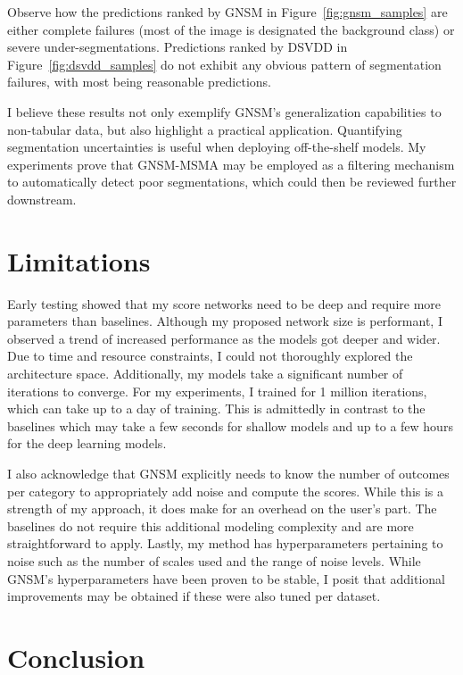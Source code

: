 Observe how the predictions ranked by GNSM in Figure~\ref{fig:gnsm_samples} are either complete failures (most of the image is designated the background class) or severe under-segmentations. Predictions ranked by DSVDD in Figure~\ref{fig:dsvdd_samples} do not exhibit any obvious pattern of segmentation failures, with most being reasonable predictions.


I believe these results not only exemplify GNSM’s generalization capabilities to non-tabular data, but also highlight a practical application. Quantifying segmentation uncertainties is useful when deploying off-the-shelf models. My experiments prove that GNSM-MSMA may be employed as a filtering mechanism to automatically detect poor segmentations, which could then be reviewed further downstream.

\section{Limitations}

Early testing showed that my score networks need to be deep and require more parameters than baselines. Although my proposed network size is performant, I observed a trend of increased performance as the models got deeper and wider. Due to time and resource constraints, I could not thoroughly explored the architecture space. Additionally, my models take a significant number of iterations to converge. For my experiments, I trained for 1 million iterations, which can take up to a day of training. This is admittedly in contrast to the baselines which may take a few seconds for shallow models and up to a few hours for the deep learning models.

I also acknowledge that GNSM explicitly needs to know the number of outcomes per category to appropriately add noise and compute the scores. While this is a strength of my approach, it does make for an overhead on the user's part. The baselines do not require this additional modeling complexity and are more straightforward to apply. Lastly, my method has hyperparameters pertaining to noise such as the number of scales used and the range of noise levels. While GNSM's hyperparameters have been proven to be stable, I posit that additional improvements may be obtained if these were also tuned per dataset.


\section{Conclusion}

